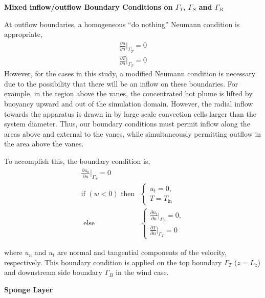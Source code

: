 \textbf{Mixed inflow/outflow Boundary Conditions on $\Gamma_T$,
$\Gamma_S$ and $\Gamma_B$}  

At outflow boundaries, a homogeneous ``do nothing'' Neumann condition is
appropriate\cite{Rannacher2000}, 
\begin{align}
  \frac{\partial u}{\partial n}\bigg|_{\Gamma_T} = 0 \\
  \frac{\partial T}{\partial n}\bigg|_{\Gamma_T} = 0
\end{align}
However, for the cases in this study, a modified Neumann condition is
necessary due to the possibility that there will be an inflow on these
boundaries. 
For example, in the region above the vanes, the concentrated hot plume is
lifted by buoyancy upward and out of the simulation domain. However, the
radial inflow towards the apparatus is drawn in by large scale
convection cells larger than the system diameter. Thus, our boundary
conditions must permit inflow along the areas above and external to the
vanes, while simultaneously permitting outflow in the area above the vanes. 


To accomplish this, the boundary condition is,
\begin{align}
  \frac{\partial u_n}{\partial n}\bigg|_{\Gamma_T} = 0 \\
  \text{if } (w<0) \text{ then}& \begin{cases}
    u_t = 0,\\
    T = T_{\text{in}}
  \end{cases} \\
  \text{ else}& \begin{cases}
    \frac{\partial u_t}{\partial n}\bigg|_{\Gamma_T} = 0, \\  
    \frac{\partial T}{\partial n}\bigg|_{\Gamma_T} = 0
  \end{cases}
\end{align}

where $u_n$ and $u_t$ are normal and tangential components of the velocity, 
respectively. This boundary condition is applied on the top boundary
$\Gamma_T$ ($z=L_z$) and downstream side boundary  $\Gamma_B$ in the wind case.

\textbf{Sponge Layer} 

